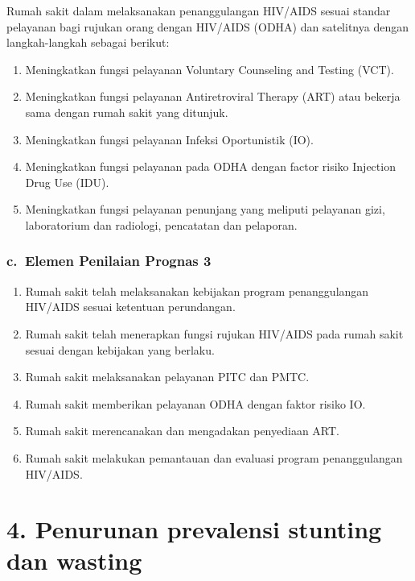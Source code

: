 \documentclass[
]{book}
\providecommand{\tightlist}{%
  \setlength{\itemsep}{0pt}\setlength{\parskip}{0pt}}
\begin{document}
Rumah sakit dalam melaksanakan penanggulangan HIV/AIDS sesuai standar pelayanan bagi rujukan orang dengan HIV/AIDS (ODHA) dan satelitnya dengan langkah-langkah sebagai berikut:

\begin{enumerate}
\def\labelenumi{\arabic{enumi}.}
\tightlist
\item
  Meningkatkan fungsi pelayanan Voluntary Counseling and Testing (VCT).
\item
  Meningkatkan fungsi pelayanan Antiretroviral Therapy (ART) atau bekerja sama dengan rumah sakit yang ditunjuk.
\item
  Meningkatkan fungsi pelayanan Infeksi Oportunistik (IO).
\item
  Meningkatkan fungsi pelayanan pada ODHA dengan factor risiko Injection Drug Use (IDU).
\item
  Meningkatkan fungsi pelayanan penunjang yang meliputi pelayanan gizi, laboratorium dan radiologi, pencatatan dan pelaporan.
\end{enumerate}

\hypertarget{c.-elemen-penilaian-prognas-3}{%
\subsubsection*{c.~Elemen Penilaian Prognas 3}\label{c.-elemen-penilaian-prognas-3}}

\begin{enumerate}
\def\labelenumi{\arabic{enumi}.}
\tightlist
\item
  Rumah sakit telah melaksanakan kebijakan program penanggulangan HIV/AIDS sesuai ketentuan perundangan.
\item
  Rumah sakit telah menerapkan fungsi rujukan HIV/AIDS pada rumah sakit sesuai dengan kebijakan yang berlaku.
\item
  Rumah sakit melaksanakan pelayanan PITC dan PMTC.
\item
  Rumah sakit memberikan pelayanan ODHA dengan faktor risiko IO.
\item
  Rumah sakit merencanakan dan mengadakan penyediaan ART.
\item
  Rumah sakit melakukan pemantauan dan evaluasi program penanggulangan HIV/AIDS.
\end{enumerate}

\hypertarget{penurunan-prevalensi-stunting-dan-wasting}{%
\section*{4. Penurunan prevalensi stunting dan wasting}\label{penurunan-prevalensi-stunting-dan-wasting}}
\end{document}
